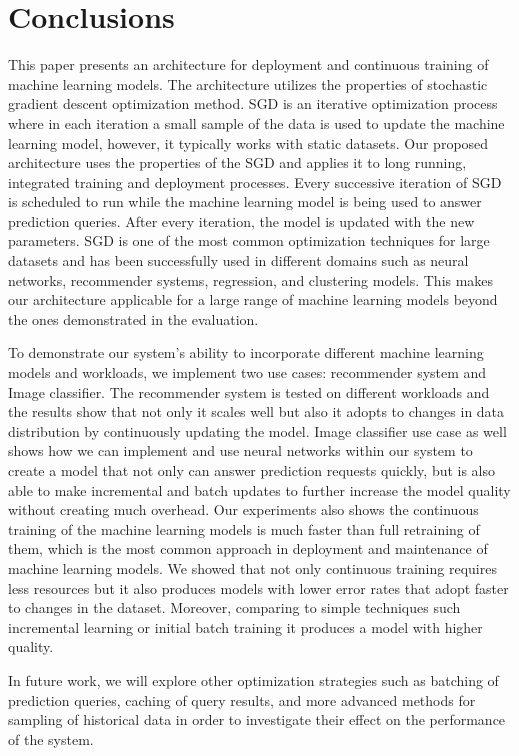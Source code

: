 \documentclass{vldb}
\begin{document}
\section{Conclusions} \label{conclusion}
This paper presents an architecture for deployment and continuous training of machine learning models.
The architecture utilizes the properties of stochastic gradient descent optimization method.
SGD is an iterative optimization process where in each iteration a small sample of the data is used to update the machine learning model, however, it typically works with static datasets.
Our proposed architecture uses the properties of the SGD and applies it to long running, integrated training and deployment processes.
Every successive iteration of SGD is scheduled to run while the machine learning model is being used to answer prediction queries.
After every iteration, the model is updated with the new parameters.
SGD is one of the most common optimization techniques for large datasets and has been successfully used in different domains such as neural networks, recommender systems, regression, and clustering models. This makes our architecture applicable for a large range of machine learning models beyond the ones demonstrated in the evaluation.

To demonstrate our system's ability to incorporate different machine learning models and workloads, we implement two use cases: recommender system and Image classifier.
The recommender system is tested on different workloads and the results show that not only it scales well but also it adopts to changes in data distribution by continuously updating the model.
Image classifier use case as well shows how we can implement and use neural networks within our system to create a model that not only can answer prediction requests quickly, but is also able to make incremental and batch updates to further increase the model quality without creating much overhead.
Our experiments also shows the continuous training of the machine learning models is much faster than full retraining of them, which is the most common approach in deployment and maintenance of machine learning models. We showed that not only continuous training requires less resources but it also produces models with lower error rates that adopt faster to changes in the dataset.
Moreover, comparing to simple techniques such incremental learning or initial batch training it produces a model with higher quality.

In future work, we will explore other optimization strategies such as batching of prediction queries, caching of query results, and more advanced methods for sampling of historical data in order to investigate their effect on the performance of the system.


\end{document}
